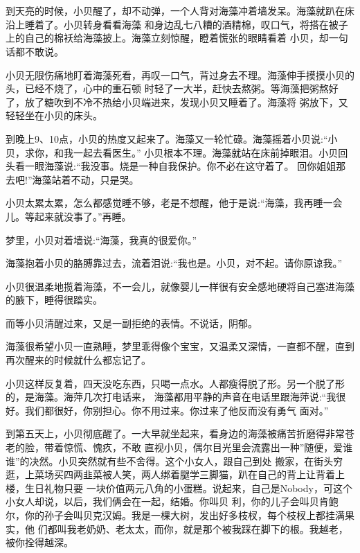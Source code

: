 \documentclass[11pt,a4paper,onecolumn]{article}
\begin{document}
\section[\thesection]{}

到天亮的时候，小贝醒了，却不动弹，一个人背对海藻冲着墙发呆。海藻就趴在床沿上睡着了。小贝转身看看海藻
和身边乱七八糟的酒精棉，叹口气，将搭在被子上的自己的棉袄给海藻披上。海藻立刻惊醒，瞪着慌张的眼睛看着
小贝，却一句话都不敢说。

小贝无限伤痛地盯着海藻死看，再叹一口气，背过身去不理。海藻伸手摸摸小贝的头，已经不烧了，心中的重石顿
时轻了一大半，赶快去熬粥。等海藻把粥熬好了，放了糖吹到不冷不热给小贝端进来，发现小贝又睡着了。海藻将
粥放下，又轻轻坐在小贝的床头。

到晚上9、10点，小贝的热度又起来了。海藻又一轮忙碌。海藻摇着小贝说:``小贝，求你，和我一起去看医生。''
小贝根本不理。海藻就站在床前掉眼泪。小贝回头看一眼海藻说:``我没事。烧是一种自我保护。你不必在这守着了。
回你姐姐那去吧!''海藻站着不动，只是哭。

小贝太累太累，怎么都感觉睡不够，老是不想醒，他于是说:``海藻，我再睡一会儿。等起来就没事了。''再睡。

梦里，小贝对着墙说:``海藻，我真的很爱你。''

海藻抱着小贝的胳膊靠过去，流着泪说:``我也是。小贝，对不起。请你原谅我。''

小贝很温柔地揽着海藻，不一会儿，就像婴儿一样很有安全感地硬将自己塞进海藻的腋下，睡得很踏实。

而等小贝清醒过来，又是一副拒绝的表情。不说话，阴郁。

海藻很希望小贝一直熟睡，梦里乖得像个宝宝，又温柔又深情，一直都不醒，直到再次醒来的时候就什么都忘记了。

小贝这样反复着，四天没吃东西，只喝一点水。人都瘦得脱了形。另一个脱了形的，是海藻。海萍几次打电话来，
海藻都用平静的声音在电话里跟海萍说:``我很好。我们都很好，你别担心。你不用过来。你过来了他反而没有勇气
面对。''

到第五天上，小贝彻底醒了。一大早就坐起来，看身边的海藻被痛苦折磨得非常苍老的脸，带着惊慌、愧疚，不敢
直视小贝，偶尔目光里会流露出一种''随便，爱谁谁''的决然。小贝突然就有些不舍得。这个小女人，跟自己到处
搬家，在街头穷逛，上菜场买四两韭菜被人笑，两人绑着腿学三脚猫，趴在自己的背上让背着上楼，生日礼物只要
一块价值两元八角的小蛋糕。说起来，自己是Nobody，可这个小女人却说，以后，我们俩会在一起，结婚。你叫贝
利，你的儿子会叫贝肯鲍尔，你的孙子会叫贝克汉姆。我是一棵大树，发出好多枝杈，每个枝杈上都挂满果实，他
们都叫我老奶奶、老太太，而你，就是那个被我踩在脚下的根。我越老，被你拴得越深。
\end{document}
